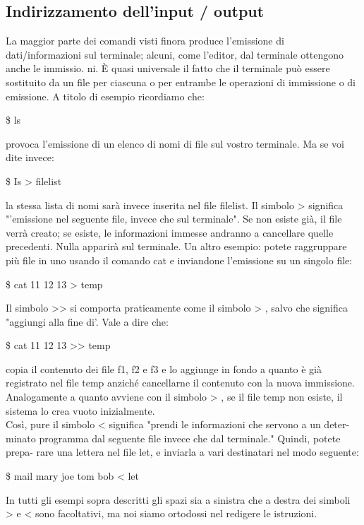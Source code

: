 \subsection{Indirizzamento dell'input / output}
La maggior parte dei comandi visti finora produce l'emissione di dati/informazioni sul terminale; alcuni, come l'editor, dal terminale ottengono anche le immissio.
ni. È quasi universale il fatto che il terminale può essere sostituito da un file per ciascuna o per entrambe le operazioni di immissione o di emissione. A titolo di esempio
ricordiamo che:
\begin{multicols}{2}
	\$ ls
\end{multicols}
provoca l'emissione di un elenco di nomi di file sul vostro terminale. Ma se voi dite
invece:
\begin{multicols}{2}
	\$ Is > filelist
\end{multicols}
la stessa lista di nomi sarà invece inserita nel file filelist. Il simbolo > significa "'emissione nel seguente file, invece che sul terminale". Se non esiste già, il file verrà creato;
se esiste, le informazioni immesse andranno a cancellare quelle precedenti. Nulla apparirà sul terminale. Un altro esempio: potete raggruppare più file in uno usando il
comando cat e inviandone l'emissione su un singolo file:
\begin{multicols}{2}
	\$ cat 11 12 13 > temp
\end{multicols}
Il simbolo >> si comporta praticamente come il simbolo > , salvo che significa "aggiungi alla fine di'. Vale a dire che:
\begin{multicols}{2}
	\$ cat 11 12 13 >> temp
\end{multicols}
copia il contenuto dei file f1, f2 e f3 e lo aggiunge in fondo a quanto è già registrato nel
file temp anziché cancellarne il contenuto con la nuova immissione. Analogamente a
quanto avviene con il simbolo >
, se il file temp non esiste, il sistema lo crea vuoto
inizialmente.\\
Così, pure il simbolo < significa "prendi le informazioni che servono a un deter-
minato programma dal seguente file invece che dal terminale." Quindi, potete prepa-
rare una lettera nel file let, e inviarla a vari destinatari nel modo seguente:
\begin{multicols}{2}
	\$ mail mary joe tom bob < let
\end{multicols}
In tutti gli esempi sopra descritti gli spazi sia a sinistra che a destra dei simboli > e <
sono facoltativi, ma noi siamo ortodossi nel redigere le istruzioni.\\
